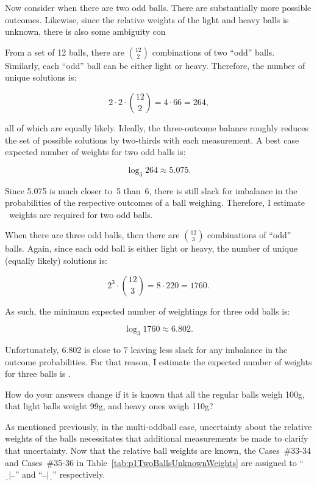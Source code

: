   Now consider when there are two odd balls.  There are substantially more possible outcomes.  Likewise, since the relative weights of the light and heavy balls is unknown, there is also some ambiguity con

  From a set of 12 balls, there are $\binom{12}{2}$ combinations of two ``odd'' balls.  Similarly, each ``odd'' ball can be either light or heavy.  Therefore, the number of unique solutions is:

  \[ 2\cdot 2 \cdot \binom{12}{2} = 4 \cdot 66 = 264 \text{,} \]

  \noindent
  all of which are equally likely.  Ideally, the three-outcome balance roughly reduces the set of possible solutions by two-thirds with each measurement.  A best case expected number of weights for two odd balls is:

  \[ \log_{3} 264\approx 5.075 {.} \]

  Since 5.075 is much closer to~5 than~6, there is still slack for imbalance in the probabilities of the respective outcomes of a ball weighing.  Therefore, I estimate ~weights are required for two odd balls.

  When there are three odd balls, then there are $\binom{12}{3}$ combinations of ``odd'' balls.  Again, since each odd ball is either light or heavy, the number of unique (equally likely) solutions is:

  \[ 2^3 \cdot \binom{12}{3} = 8 \cdot 220 = 1760 \text{.} \]

  \noindent
  As such, the minimum expected number of weightings for three odd balls is:

  \[ \log_{3} 1760 \approx 6.802 \text{.} \]

  \noindent
  Unfortunately, $6.802$ is close to $7$ leaving less slack for any imbalance in the outcome probabilities.  For that reason, I estimate the expected number of weights for three balls is .

\begin{subproblem}
  How do your answers change if it is known that all the regular balls weigh 100g, that light balls weight 99g, and heavy ones weigh 110g?
\end{subproblem}

  As mentioned previously, in the multi-oddball case, uncertainty about the relative weights of the balls necessitates that additional measurements be made to clarify that uncertainty.  Now that the relative ball weights are known, the Cases~\#33-34 and Cases~\#35-36 in Table~\ref{tab:p1TwoBallsUnknownWeights} are assigned to ``${\underline{~~}|\bar{~}\bar{~}}$'' and ``${\bar{~}\bar{~}|\underline{~~}}$'' respectively.